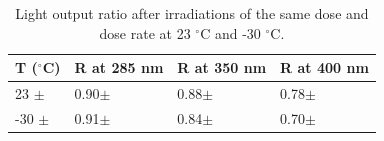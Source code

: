 \documentclass[preprint,12pt]{elsarticle}
\begin{document}
\begin{table}[!h]
\centering
  \caption{Light output ratio after irradiations of the same dose and dose rate at 23 $^\circ$C and -30 $^\circ$C.}
  \begin{tabular}{l|l|l|l}
    \hline
    T ($^\circ$C)  & R at 285 nm	& R at 350 nm	& R at 400 nm    \\ \hline 
    23  $\pm$    & 0.90$\pm$	& 0.88$\pm$	& 0.78$\pm$   \\ \hline
    -30 $\pm$    & 0.91$\pm$	& 0.84$\pm$	& 0.70$\pm$   \\ 
    \hline
  \end{tabular}
  \label{table:3}
\end{table}














\end{document}
